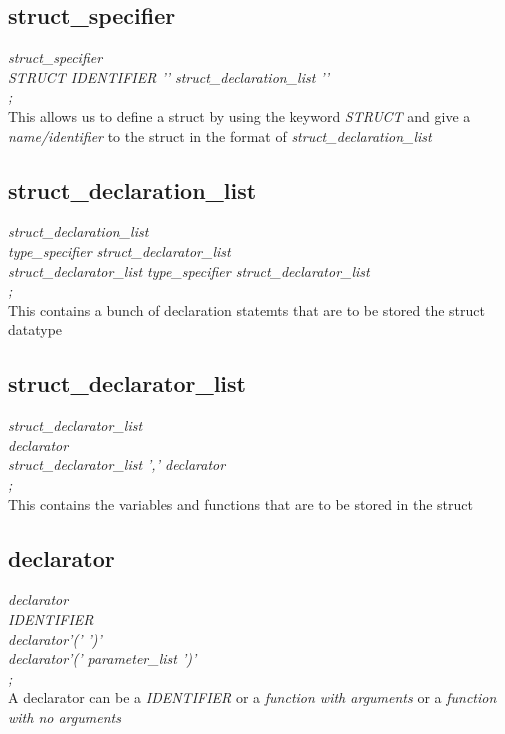 \documentclass[11pt]{article}
\begin{document}
\subsection{struct\_specifier}
{\itshape
struct\_specifier\\
\hspace*{1cm}  STRUCT IDENTIFIER '{' struct\_declaration\_list '}'\\
\hspace*{1cm};\\
}
This allows us to define a struct by using the keyword \textit{STRUCT} and give a \textit{name/identifier} to the struct in the format of \textit{struct\_declaration\_list }
\subsection{struct\_declaration\_list}
{\itshape
struct\_declaration\_list\\
\hspace*{1cm} type\_specifier struct\_declarator\_list\\
\hspace*{1cm}   struct\_declarator\_list type\_specifier struct\_declarator\_list\\
\hspace*{1cm};\\
}
This contains a bunch of declaration statemts that are to be stored the struct datatype
\subsection{struct\_declarator\_list}
{\itshape
struct\_declarator\_list\\
\hspace*{1cm} declarator\\
\hspace*{1cm}   struct\_declarator\_list ',' declarator\\
\hspace*{1cm};\\
}
This contains the variables and functions that are to be stored in the struct
\subsection{declarator}
{\itshape
declarator\\
\hspace*{1cm} IDENTIFIER \\
\hspace*{1cm}   declarator'(' ')'\\
\hspace*{1cm}   declarator'(' parameter\_list ')'\\
\hspace*{1cm};\\
}
A declarator can be a \textit{IDENTIFIER} or a \textit{function with arguments} or a \textit{function with no arguments}
\end{document}
